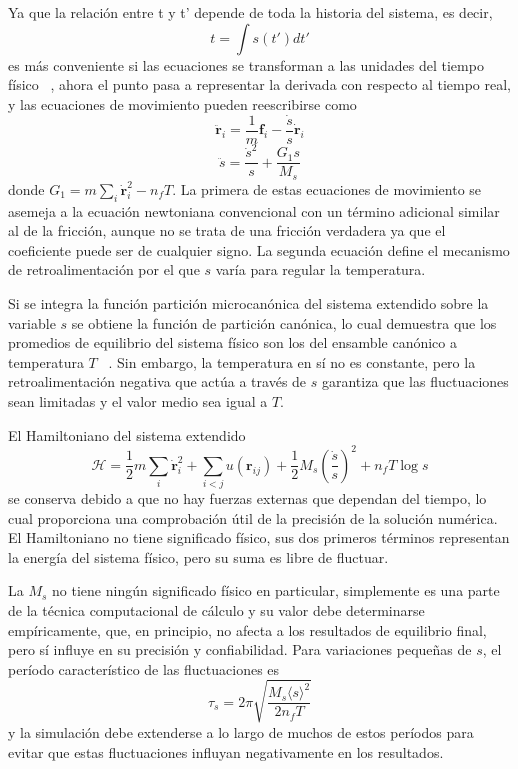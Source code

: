 Ya que la relación entre t y t' depende de toda la historia del sistema, es decir,
$$
t = \int s(t') dt'
$$
es más conveniente si las ecuaciones se transforman a las unidades del tiempo
físico ~\cite{nose1984b, hoover85}, ahora el punto pasa a representar la derivada
con respecto al tiempo real, y las ecuaciones de movimiento pueden reescribirse 
como
$$
\ddot{\mathbf{r}}_i = \frac{1}{m} \mathbf{f}_i - \frac{\dot{s}}{s} \dot{\mathbf{r}}_i
$$
$$
\ddot{s} = \frac{\dot{s}^2}{s} + \frac{G_1 s}{M_s} 
$$
donde $G_1 = m \sum_i \dot{\mathbf{r}}_i^2 - n_f T$. La primera de estas 
ecuaciones de movimiento se asemeja a la ecuación newtoniana convencional con un 
término adicional similar al de la fricción, aunque no se trata de una fricción 
verdadera ya que el coeficiente puede ser de cualquier signo. La segunda ecuación 
define el mecanismo de retroalimentación por el que $s$ varía para regular la 
temperatura.

Si se integra la función partición microcanónica del sistema extendido sobre la
variable $s$ se obtiene la función de partición canónica, lo cual demuestra que
los promedios de equilibrio del sistema físico son los del ensamble canónico a
temperatura $T$ ~\cite{nose1984a}. Sin embargo, la temperatura en sí no es 
constante, pero la retroalimentación negativa que actúa a través de $s$ garantiza
que las fluctuaciones sean limitadas y el valor medio sea igual a $T$.

El Hamiltoniano del sistema extendido
$$
\mathcal{H} = \frac{1}{2} m \sum_i \dot{\mathbf{r}}_i^2 + \sum_{i<j} u(\mathbf{r}_{ij}) + \frac{1}{2} M_s \left(\frac{\dot{s}}{s}\right)^2 + n_f T \log s
$$
se conserva debido a que no hay fuerzas externas que dependan del tiempo, lo cual 
proporciona una comprobación útil de la precisión de la solución numérica. El 
Hamiltoniano no tiene significado físico, sus dos primeros términos representan 
la energía del sistema físico, pero su suma es libre de fluctuar.

La $M_s$ no tiene ningún significado físico en particular, simplemente es una 
parte de la técnica computacional de cálculo y su valor debe determinarse 
empíricamente, que, en principio, no afecta a los resultados de equilibrio final, 
pero sí influye en su precisión y confiabilidad. Para variaciones pequeñas de $s$, 
el período característico de las fluctuaciones es ~\cite{nose1984a}
$$
\tau_s = 2 \pi \sqrt{\frac{M_s \langle s \rangle^2}{2 n_f T}}
$$
y la simulación debe extenderse a lo largo de muchos de estos períodos para evitar 
que estas fluctuaciones influyan negativamente en los resultados.

